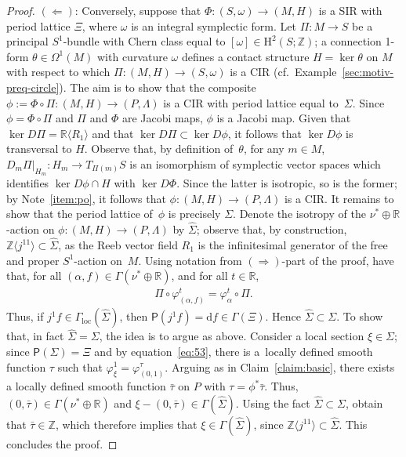 \documentclass[10pt,a4paper]{amsart}
\numberwithin{equation}{section}
\newcommand{\de}{\mathrm{d}} %
\newcommand{\CM}{(M,H)} %
\newcommand{\SM}{(S,\omega)} %
\newcommand{\PM}{(P,\Lambda)} %
\newcommand{\HH}{\mathrm{H}}
\newcommand{\RR}{\mathbb{R}}
\newcommand{\ZZ}{\mathbb{Z}}
\begin{document}
\begin{proof}
\underline{$(\Leftarrow)$}: Conversely, suppose that $\Phi \colon \SM \to \CM$ is a SIR with period lattice $\Xi$, where $\omega$ is an integral symplectic form. Let $\Pi \colon M \to S$ be a principal $S^1$-bundle with Chern class equal to $[\omega] \in \HH^2(S;\ZZ)$; a connection 1-form $\theta \in \Omega^1(M)$ with curvature $\omega$ def\/ines a contact structure $H=\ker \theta$ on $M$ with respect to which $\Pi \colon \CM \to \SM$ is a CIR (cf.\ Example~\ref{sec:motiv-preq-circle}). The aim is to show that the composite $\phi:= \Phi \circ \Pi \colon \CM \to \PM$ is a CIR with period lattice equal to~$\Sigma$. Since $\phi = \Phi \circ \Pi$ and $\Pi$ and $\Phi$ are Jacobi maps, $\phi$ is a Jacobi map. Given that $\ker D \Pi = \RR\langle R_1\rangle$ and that $\ker D \Pi \subset \ker D \phi$, it follows that $\ker D \phi$ is transversal to $H$. Observe that, by def\/inition of~$\theta$, for any $m \in M$, $D_m \Pi|_{H_m}\colon H_m \to T_{\Pi(m)}S$ is an isomorphism of symplectic vector spaces which identif\/ies $\ker D\phi \cap H$ with $\ker D\Phi$. Since the latter is isotropic, so is the former; by Note~\ref{item:po}, it follows that $\phi \colon \CM \to \PM$ is a CIR. It remains to show that the period lattice of~$\phi$ is precisely $\Sigma$. Denote the isotropy of the $\nu^* \oplus \RR$-action on $\phi \colon \CM \to \PM$ by $\hat{\Sigma}$; observe that, by construction, $\ZZ\langle j^11\rangle \subset \hat{\Sigma}$, as the Reeb vector f\/ield $R_1$ is the inf\/initesimal generator of the free and proper $S^1$-action on~$M$. Using notation from $(\Rightarrow)$-part of the proof, have that, for all $(\alpha,f) \in \Gamma(\nu^* \oplus \RR)$, and for all $t \in \RR$,
 \begin{gather} \label{eq:53}
 \Pi \circ \varphi^t_{(\alpha,f)} = \varphi^t_{\alpha} \circ \Pi.
 \end{gather}
Thus, if $j^1f \in \Gamma_{\mathrm{loc}}(\hat{\Sigma})$, then $\mathsf{P}(j^1f) = \de f \in \Gamma(\Xi)$. Hence $\hat{\Sigma} \subset \Sigma$. To show that, in fact $\hat{\Sigma} = \Sigma$, the idea is to argue as above. Consider a local section $\xi \in \Sigma$; since $\mathsf{P}(\Sigma) = \Xi$ and by equation~\eqref{eq:53}, there is a~locally def\/ined smooth function $\tau$ such that $\varphi^1_{\xi} = \varphi^{\tau}_{(0,1)}$. Arguing as in Claim~\ref{claim:basic}, there exists a locally def\/ined smooth function $\bar{\tau}$ on $P$ with $\tau = \phi^*\bar{\tau}$. Thus, $(0,\bar{\tau}) \in \Gamma(\nu^* \oplus \RR)$ and $\xi - (0,\bar{\tau}) \in \Gamma(\hat{\Sigma})$. Using the fact $\hat{\Sigma} \subset \Sigma$, obtain that $\bar{\tau} \in \ZZ$, which therefore implies that $\xi \in \Gamma(\hat{\Sigma})$, since $\ZZ\langle j^11\rangle \subset \hat{\Sigma}$. This concludes the proof.
\end{proof}
\end{document}

